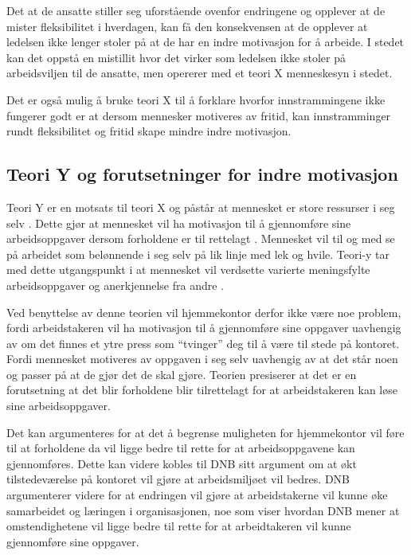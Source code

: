 Det at de ansatte stiller seg uforstående ovenfor endringene og opplever at de mister fleksibilitet i hverdagen, kan få den konsekvensen at de opplever at ledelsen ikke lenger stoler på at de har en indre motivasjon for å arbeide. I stedet kan det oppstå en mistillit hvor det virker som ledelsen ikke stoler på arbeidsviljen til de ansatte, men opererer med et teori X menneskesyn i stedet.

Det er også mulig å bruke teori X til å forklare hvorfor innstrammingene ikke fungerer godt er at dersom mennesker motiveres av fritid, kan innstramminger rundt fleksibilitet og fritid skape mindre indre motivasjon.

\subsection{Teori Y og forutsetninger for indre motivasjon}

Teori Y er en motsats til teori X og påstår at mennesket er store ressurser i seg selv \parencite[s.~427]{einarsen2023}. Dette gjør at mennesket vil ha motivasjon til å gjennomføre sine arbeidsoppgaver dersom forholdene er til rettelagt \parencite[s.~427]{einarsen2023}. Mennesket vil til og med se på arbeidet som belønnende i seg selv på lik linje med lek og hvile. Teori-y tar med dette utgangspunkt i at mennesket vil verdsette varierte meningsfylte arbeidsoppgaver og anerkjennelse fra andre \parencite[s.~427]{einarsen2023}.

Ved benyttelse av denne teorien vil hjemmekontor derfor ikke være noe problem, fordi arbeidstakeren vil ha motivasjon til å gjennomføre sine oppgaver uavhengig av om det finnes et ytre press som \enquote{tvinger} deg til å være til stede på kontoret. Fordi mennesket motiveres av oppgaven i seg selv uavhengig av at det står noen og passer på at de gjør det de skal gjøre. Teorien presiserer at det er en forutsetning at det blir forholdene blir tilrettelagt for at arbeidstakeren kan løse sine arbeidsoppgaver.

Det kan argumenteres for at det å begrense muligheten for hjemmekontor vil føre til at forholdene da vil ligge bedre til rette for at arbeidsoppgavene kan gjennomføres. Dette kan videre kobles til DNB sitt argument om at økt tilstedeværelse på kontoret vil gjøre at arbeidsmiljøet vil bedres. DNB argumenterer videre for at endringen vil gjøre at arbeidstakerne vil kunne øke samarbeidet og læringen i organisasjonen, noe som viser hvordan DNB mener at omstendighetene vil ligge bedre til rette for at arbeidtakeren vil kunne gjennomføre sine oppgaver.

